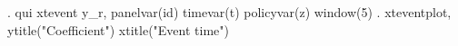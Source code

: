 . qui xtevent y_r, panelvar(id) timevar(t) policyvar(z) window(5)
{\smallskip}
. xteventplot, ytitle("Coefficient") xtitle("Event time")
